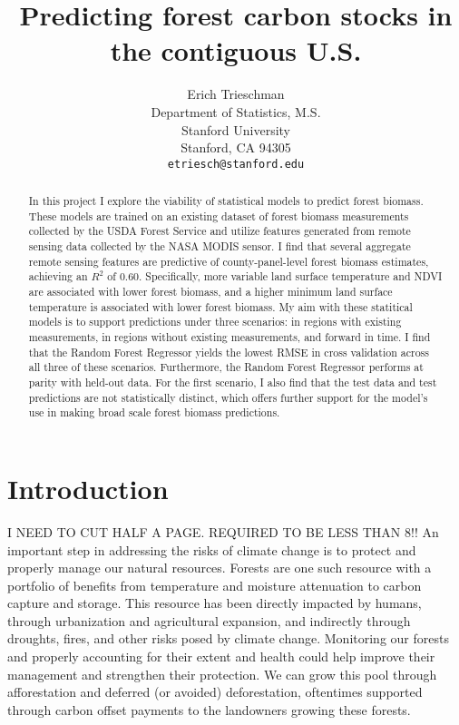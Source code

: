 \documentclass{article}
\title{Predicting forest carbon stocks in the contiguous U.S.}
\author{%
  Erich Trieschman\\
  Department of Statistics, M.S.\\
  Stanford University\\
  Stanford, CA 94305\\
  \texttt{etriesch@stanford.edu} \\
}
\begin{document}
\maketitle

\begin{abstract}
In this project I explore the viability of statistical models to predict forest biomass. These models are trained on an existing dataset of forest biomass measurements collected by the USDA Forest Service and utilize features generated from remote sensing data collected by the NASA MODIS sensor. I find that several aggregate remote sensing features are predictive of county-panel-level forest biomass estimates, achieving an $R^2$ of 0.60. Specifically, more variable land surface temperature and NDVI are associated with lower forest biomass, and a higher minimum land surface temperature is associated with lower forest biomass. My aim with these statitical models is to support predictions under three scenarios: in regions with existing measurements, in regions without existing measurements, and forward in time. I find that the Random Forest Regressor yields the lowest RMSE in cross validation across all three of these scenarios. Furthermore, the Random Forest Regressor performs at parity with held-out data. For the first scenario, I also find that the test data and test predictions are not statistically distinct, which offers further support for the model's use in making broad scale forest biomass predictions.
\end{abstract}

\section{Introduction}
\label{sec:intro}
I NEED TO CUT HALF A PAGE. REQUIRED TO BE LESS THAN 8!!
An important step in addressing the risks of climate change is to protect and properly manage our natural resources. Forests are one such resource with a portfolio of benefits from temperature and moisture attenuation to carbon capture and storage. This resource has been directly impacted by humans, through urbanization and agricultural expansion, and indirectly through droughts, fires, and other risks posed by climate change. Monitoring our forests and properly accounting for their extent and health could help improve their management and strengthen their protection. We can grow this pool through afforestation and deferred (or avoided) deforestation, oftentimes supported through carbon offset payments to the landowners growing these forests. 
\end{document}
